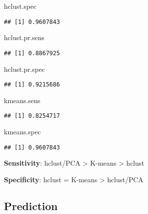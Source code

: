 \documentclass[
]{article}
\newenvironment{Shaded}{\begin{snugshade}}{\end{snugshade}}
\newcommand{\NormalTok}[1]{#1}
\begin{document}
\begin{Shaded}
\begin{Highlighting}[]
\NormalTok{hclust.spec}
\end{Highlighting}
\end{Shaded}

\begin{verbatim}
## [1] 0.9607843
\end{verbatim}

\begin{Shaded}
\begin{Highlighting}[]
\NormalTok{hclust.pr.sens}
\end{Highlighting}
\end{Shaded}

\begin{verbatim}
## [1] 0.8867925
\end{verbatim}

\begin{Shaded}
\begin{Highlighting}[]
\NormalTok{hclust.pr.spec}
\end{Highlighting}
\end{Shaded}

\begin{verbatim}
## [1] 0.9215686
\end{verbatim}

\begin{Shaded}
\begin{Highlighting}[]
\NormalTok{kmeans.sens}
\end{Highlighting}
\end{Shaded}

\begin{verbatim}
## [1] 0.8254717
\end{verbatim}

\begin{Shaded}
\begin{Highlighting}[]
\NormalTok{kmeans.spec}
\end{Highlighting}
\end{Shaded}

\begin{verbatim}
## [1] 0.9607843
\end{verbatim}

\textbf{Sensitivity}: hclust/PCA \textgreater{} K-means \textgreater{}
hclust

\textbf{Specificity}: hclust = K-means \textgreater{} hclust/PCA

\hypertarget{prediction}{%
\subsection{Prediction}\label{prediction}}
\end{document}
